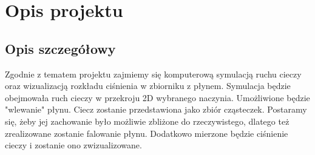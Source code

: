 \documentclass[a4paper]{article}
\begin{document}

\section{Opis projektu}
\subsection{Opis szczegółowy}
Zgodnie z tematem projektu zajmiemy się komputerową symulacją ruchu cieczy oraz wizualizacją rozkładu ciśnienia w zbiorniku z płynem.
Symulacja będzie obejmowała ruch cieczy w przekroju 2D wybranego naczynia.  Umożliwione będzie "wlewanie" płynu. Ciecz zostanie przedstawiona jako zbiór cząsteczek. Postaramy się, żeby jej zachowanie było możliwie zbliżone do rzeczywistego, dlatego też zrealizowane zostanie falowanie płynu.
Dodatkowo mierzone będzie ciśnienie cieczy i zostanie ono zwizualizowane.
\end{document}
